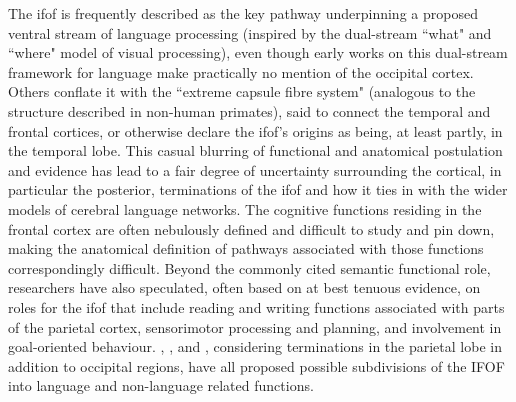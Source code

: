 The \gls{ifof} is frequently described as the key pathway underpinning a proposed ventral stream of language processing\autocite{Duffau2013a,Rollans2018,Voets2017,DavidPoeppel2012} (inspired by the dual-stream ``what" and ``where" model of visual processing), even though early works on this dual-stream framework for language make practically no mention of the occipital cortex.\autocite{Hickok2004,DavidPoeppel2012,Kummerer2013}
Others conflate it with the ``extreme capsule fibre system"\autocite{Friederici2013a,Zhang2018} (analogous to the structure described in non-human primates\autocite{Mandonnet2018,ThiebautdeSchotten2012}), said to connect the temporal and frontal cortices,\autocite{Kummerer2013}
or otherwise declare the \gls{ifof}'s origins as being, at least partly, in the temporal lobe.\autocite{Bajada2015a}
This casual blurring of functional and anatomical postulation and evidence has lead to a fair degree of uncertainty surrounding the cortical, in particular the posterior,\autocite{Martino2010,Forkel2014a,Weiller2021} terminations of the \gls{ifof} and how it ties in with the wider models of cerebral language networks.
\autocite{Duffau2013a, Mandonnet2018, Rollans2018, Friederici2013a}
The cognitive functions residing in the frontal cortex are often nebulously defined and difficult to study and pin down, making the anatomical definition of pathways associated with those functions correspondingly difficult.
Beyond the commonly cited semantic functional role, researchers have also speculated, often based on at best tenuous evidence, on roles for the \gls{ifof} that include reading and writing functions associated with parts of the parietal cortex,\autocite{Motomura2014} sensorimotor processing\autocite{Martino2010} and planning,\autocite{Sarubbo2013} and involvement in goal-oriented behaviour.\autocite{Conner2018}
\textcite{Sarubbo2013}, \textcite{Martino2010}, and \textcite{Rollans2018}, considering terminations in the parietal lobe in addition to occipital regions, have all proposed possible subdivisions of the IFOF into language and non-language related functions.

